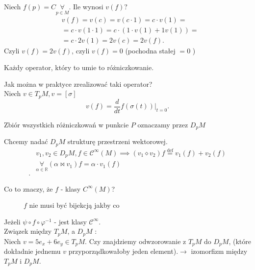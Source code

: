 \documentclass[../main.tex]{subfiles}
\begin{document}
    \begin{figure}[h]
        \centering
        \label{fig:fig_52}
    \end{figure}

    \begin{przyklad}
        Niech $f(p) = C \underset{p\in M}{\forall} $. Ile wynosi $v(f)?$
         \begin{align*}
            &v(f) = v(c) = v(c \cdot 1) = c \cdot v(1) = \\
            &=  c \cdot v(1\cdot 1) = c \cdot (1 \cdot v(1) + 1v(1)) =\\
            &= c \cdot 2v(1) = 2v(c) = 2v(f)
        .\end{align*}
        Czyli $v(f) = 2v(f)$, czyli $v(f) = 0$ (pochodna stałej $=0$ )
    \end{przyklad}
    Każdy operator, który to umie to różniczkowanie.
    \begin{pytanie}
        Jak można w praktyce zrealizować taki operator?\\
        Niech $v\in T_pM, v=[\sigma]$
         \[
             v(f) = \frac{d}{dt}f(\sigma(t))|_{t=0}
        .\]
    \end{pytanie}
    \begin{definicja}
        Zbiór wszystkich różniczkowań w punkcie $P$ oznaczamy przez $D_pM$
    \end{definicja}
    Chcemy nadać $D_pM$ strukturę przestrzeni wektorowej.
    \begin{align*}
        &v_1,v_2\in D_pM, f\in \mathcal{C}^{\infty}(M) \implies (v_1 \diamond v_2)f \overset{\text{def}}{=} v_1(f) + v_2(f)\\
        &\underset{\alpha\in\mathbb{R}}{\forall} (\alpha \bowtie v_1)f = \alpha \cdot v_1(f) \\
    .\end{align*}
    \begin{pytanie}
        Co to znaczy, że $f$ - klasy $C^{\infty}(M)$?
    \end{pytanie}
    \begin{figure}[h]
        \centering
        \caption{$f$ nie musi być bijekcją jakby co}
        \label{fig:fig_53}
    \end{figure}

    Jeżeli $\psi \circ f \circ \varphi^{-1}$ - jest klasy $\mathcal{C}^{\infty}$.\\
    Związek między $T_pM$, a $D_pM$ :\\
    Niech $v = 5e_x + 6e_y \in T_pM$. Czy znajdziemy odwzorowanie z  $T_pM$ do $D_pM$, (które dokładnie jednemu $v$ przyporządkowałoby jeden element).$\rightarrow$ izomorfizm między $T_pM$ i $D_pM$.
\end{document}
